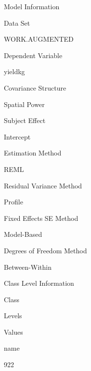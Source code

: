 \documentclass[
]{book}
\begin{document}
Model Information

Data Set

WORK.AUGMENTED

Dependent Variable

yieldkg

Covariance Structure

Spatial Power

Subject Effect

Intercept

Estimation Method

REML

Residual Variance Method

Profile

Fixed Effects SE Method

Model-Based

Degrees of Freedom Method

Between-Within

Class Level Information

Class

Levels

Values

name

922
\end{document}
